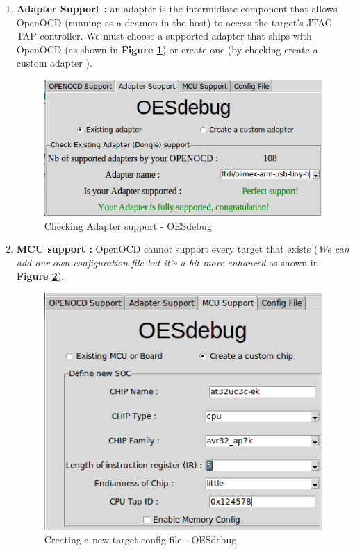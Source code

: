 \begin{enumerate}
\begin{enumerate}
			
		\item \textbf{Adapter Support : } an adapter is the intermidiate component that allows OpenOCD (running as a deamon in the host) to access the target's JTAG TAP controller. We must choose a supported adapter that ships with OpenOCD (as shown in \textbf{Figure \ref{Checking Adapter support - OESdebug}}) or create one (by checking \og create a custom adapter \fg).
		\begin{figure}[H]
			\centering
        	\includegraphics[scale=0.32]{img/solution/OESdebug-adapterSupport.png}
        	\caption{Checking Adapter support - OESdebug}
        	\label{Checking Adapter support - OESdebug}
    	\end{figure}
    			
		\item \textbf{MCU support : } OpenOCD cannot support every target that exists (\textit{We can add our own configuration file but it's a bit more enhanced} as shown in \textbf{Figure \ref{Creating a new target config file - OESdebug}}).
		\begin{figure}[H]
			\centering
        	\includegraphics[scale=0.32]{img/solution/OESdebug-new-board.png}
        	\caption{Creating a new target config file - OESdebug}
        	\label{Creating a new target config file - OESdebug}
    	\end{figure}
    			

\end{enumerate}
\end{enumerate}
